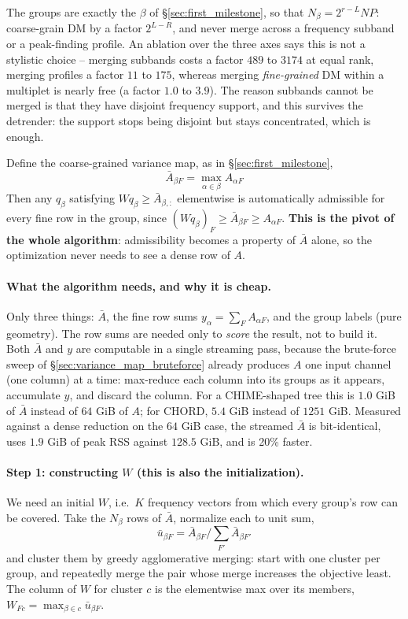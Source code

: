 \documentclass{article}
\numberwithin{equation}{section}   %
\begin{document}
The groups are exactly the $\beta$ of \S\ref{sec:first_milestone}, so that
$N_\beta = 2^{r-L}NP$: coarse-grain DM by a factor
$2^{L-R}$, and never merge across a frequency subband or a peak-finding profile. An ablation
over the three axes says this is not a stylistic choice -- merging subbands costs a factor
$489$ to $3174$ at equal rank, merging profiles a factor $11$ to $175$, whereas merging
{\em fine-grained} DM within a multiplet is nearly free (a factor $1.0$ to $3.9$). The reason
subbands cannot be merged is that they have disjoint frequency support, and this survives the
detrender: the support stops being disjoint but stays concentrated, which is enough.

Define the coarse-grained variance map, as in \S\ref{sec:first_milestone},
\begin{equation}
\bar A_{\beta F} = \max_{\alpha \in \beta} A_{\alpha F}
\label{eq:varmap_abar}
\end{equation}
Then any $q_\beta$ satisfying $W q_\beta \ge \bar A_{\beta,:}$ elementwise is automatically
admissible for every fine row in the group, since $(Wq_\beta)_F \ge \bar A_{\beta F} \ge
A_{\alpha F}$. {\bf This is the pivot of the whole algorithm}: admissibility becomes a property
of $\bar A$ alone, so the optimization never needs to see a dense row of $A$.

\paragraph*{What the algorithm needs, and why it is cheap.}
Only three things: $\bar A$, the fine row sums $y_\alpha = \sum_F A_{\alpha F}$, and the group
labels (pure geometry). The row sums are needed only to {\em score} the result, not to build it.
Both $\bar A$ and $y$ are computable in a single streaming pass, because the brute-force sweep
of \S\ref{sec:variance_map_bruteforce} already produces $A$ one input channel (one column) at a
time: max-reduce each column into its groups as it appears, accumulate $y$, and discard the
column. For a CHIME-shaped tree this is $1.0$ GiB of $\bar A$ instead of $64$ GiB of $A$; for
CHORD, $5.4$ GiB instead of $1251$ GiB. Measured against a dense reduction on the $64$ GiB case,
the streamed $\bar A$ is bit-identical, uses $1.9$ GiB of peak RSS against $128.5$ GiB, and is
20\% faster.

\paragraph*{Step 1: constructing $W$ (this is also the initialization).}
We need an initial $W$, i.e.\ $K$ frequency vectors from which every group's row can be covered.
Take the $N_\beta$ rows of $\bar A$, normalize each to unit sum,
\begin{equation}
\bar u_{\beta F} = \bar A_{\beta F} \Big/ \sum_{F'} \bar A_{\beta F'}
\end{equation}
and cluster them by greedy agglomerative merging: start with one cluster per group, and
repeatedly merge the pair whose merge increases the objective least. The column of $W$ for
cluster $c$ is the elementwise max over its members, $W_{Fc} = \max_{\beta \in c} \bar
u_{\beta F}$.
\end{document}

